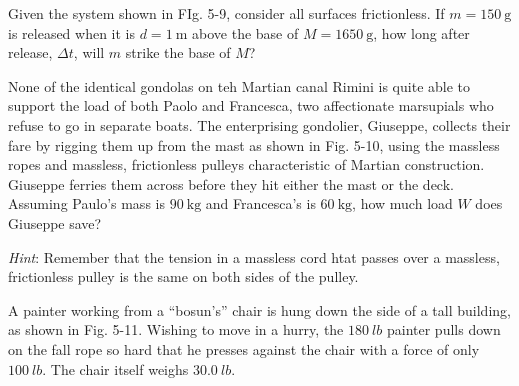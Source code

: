 \documentclass[../feynman-lectures-on-physics.tex]{subfiles}
\begin{document}
\begin{questions}
\begin{solution}
\end{solution}

\question Given the system shown in FIg. 5-9, consider all surfaces
frictionless. If $m=\SI{150}{\gram}$ is released when it is $d = \SI{1}{\meter}$
above the base of $M=\SI{1650}{\gram}$, how long after release, $\Delta{t}$,
will $m$ strike the base of $M$?

\question None of the identical gondolas on teh Martian canal Rimini is quite
able to support the load of both Paolo and Francesca, two affectionate marsupials
who refuse to go in separate boats. The enterprising gondolier, Giuseppe,
collects their fare by rigging them up from the mast as shown in Fig. 5-10,
using the massless ropes and massless, frictionless pulleys characteristic of
Martian construction. Giuseppe ferries them across before they hit either the
mast or the deck. Assuming Paulo's mass is $\SI{90}{\kilo\gram}$ and Francesca's
is $\SI{60}{\kilo\gram}$, how much load $W$ does Giuseppe save?

\textit{Hint}: Remember that the tension in a massless cord htat passes over a
massless, frictionless pulley is the same on both sides of the pulley.

\question A painter working from a ``bosun's'' chair is hung down the side of a
tall building, as shown in Fig. 5-11. Wishing to move in a hurry, the
$\SI{180}{lb}$ painter pulls down on the fall rope so hard that he presses
against the chair with a force of only $\SI{100}{lb}$. The chair itself weighs
$\SI{30.0}{lb}$.
\begin{parts}

\end{parts}
\end{questions}
\end{document}
